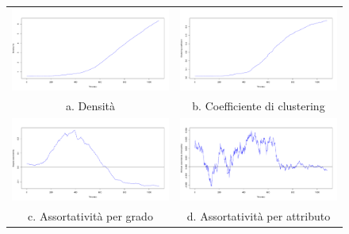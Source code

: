 \documentclass[a4paper,12pt]{article}
\begin{document}
\begin{figure}[h]
\begin{tabular}{cc}
  \includegraphics[width=81mm]{images/evolution_1000_rnd_1080_05_0.pdf} &   \includegraphics[width=81mm]{images/clustering_1000_rnd_1080_05_0.pdf} \\
a. Densità & b. Coefficiente di clustering \\[6pt]
 \includegraphics[width=81mm]{images/deg_assortativity_1000_rnd_1080_05_0.pdf} &   \includegraphics[width=81mm]{images/homophily_1000_rnd_1080_05_0.pdf} \\
c. Assortatività per grado & d. Assortatività per attributo \\[6pt]
\end{tabular}
\end{figure}
\end{document}
